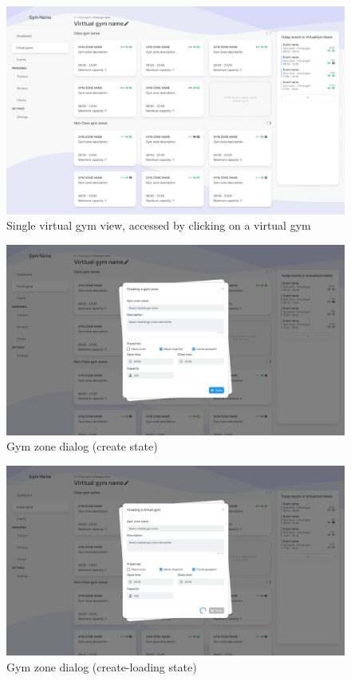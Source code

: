 \documentclass[a4paper, 12pt, oneside]{book}
\begin{document}
\begin{figure}[h!]
	\centering
	\includegraphics[width=\textwidth]{assets/ui/VirtualGym.png}
	\caption{Single virtual gym view, accessed by clicking on a virtual gym}
\end{figure}
\begin{figure}[h!]
	\centering
	\includegraphics[width=\textwidth]{assets/ui/CreateGymZone.png}
	\caption{Gym zone dialog (create state)}
\end{figure}
\begin{figure}[h!]
	\centering
	\includegraphics[width=\textwidth]{assets/ui/CreateLoadingGymZone.png}
	\caption{Gym zone dialog (create-loading state)}
\end{figure}
\end{document}
